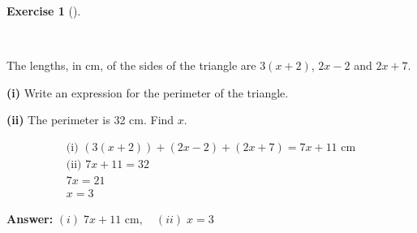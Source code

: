 \documentclass[
  letterpaper,
  DIV=11,
  numbers=noendperiod]{scrreprt}
\theoremstyle{definition}
\newtheorem{exercise}{Exercise}[chapter]
\theoremstyle{remark}
\begin{document}
\begin{exercise}[]\protect\hypertarget{exr-u5-18-1}{}\label{exr-u5-18-1}

~

The lengths, in cm, of the sides of the triangle are \(3(x + 2)\),
\(2x - 2\) and \(2x + 7\).

\textbf{(i)} Write an expression for the perimeter of the triangle.

\textbf{(ii)} The perimeter is 32 cm. Find \(x\).

\begin{tcolorbox}[enhanced jigsaw, opacitybacktitle=0.6, coltitle=black, arc=.35mm, colframe=quarto-callout-tip-color-frame, colback=white, bottomrule=.15mm, left=2mm, colbacktitle=quarto-callout-tip-color!10!white, titlerule=0mm, opacityback=0, title=\textcolor{quarto-callout-tip-color}{\faLightbulb}\hspace{0.5em}{🔍 View Solution}, leftrule=.75mm, breakable, rightrule=.15mm, bottomtitle=1mm, toptitle=1mm, toprule=.15mm]

\begin{align*}
\text{(i) } (3(x + 2)) + (2x - 2) + (2x + 7) = 7x + 11 \text{ cm} \\ \text{(ii) } 7x + 11 = 32 \\ 7x = 21 \\ x = 3
\end{align*}

\textbf{Answer:} \((i)\; 7x + 11 \text{ cm},\quad (ii)\; x = 3\)

\end{tcolorbox}

\end{exercise}
\end{document}
